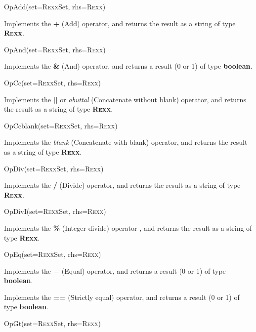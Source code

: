 \begin{description}
\item{OpAdd(set=R\textsc{exx}Set, rhs=R\textsc{exx})}

Implements the \nr{} \textbf{\textbf{+}} (Add) operator,
and returns the result as a string of type \textbf{R\textsc{exx}}.
\item{OpAnd(set=R\textsc{exx}Set, rhs=R\textsc{exx})}

Implements the \nr{} \textbf{\textbf{\&}} (And)
operator,
and returns a result (0 or 1) of type \textbf{boolean}.
\item{OpCc(set=R\textsc{exx}Set, rhs=R\textsc{exx})}

Implements the \nr{} \textbf{\textbf{||}} or
\emph{abuttal} (Concatenate without blank) operator, and
returns the result as a string of type \textbf{R\textsc{exx}}.
\item{OpCcblank(set=R\textsc{exx}Set, rhs=R\textsc{exx})}

Implements the \nr{} \emph{blank} (Concatenate with blank)
operator, and returns the result as a string of type \textbf{R\textsc{exx}}.
\item{OpDiv(set=R\textsc{exx}Set, rhs=R\textsc{exx})}

Implements the \nr{} \textbf{\textbf{/}} (Divide) operator,
and returns the result as a string of type \textbf{R\textsc{exx}}.
\item{OpDivI(set=R\textsc{exx}Set, rhs=R\textsc{exx})}

Implements the \nr{} \textbf{\textbf{\%}} (Integer divide) operator
, and returns the result as a string of type \textbf{R\textsc{exx}}.
\item{OpEq(set=R\textsc{exx}Set, rhs=R\textsc{exx})}

Implements the \nr{} \textbf{\textbf{=}} (Equal) operator,
and returns a result (0 or 1) of type \textbf{boolean}.

\item[OpEqS(set=R\textsc{exx}Set, rhs=R\textsc{exx})]\label{refopeqs}

Implements the \nr{} \textbf{\textbf{==}} (Strictly equal)
operator, and returns a result (0 or 1) of type \textbf{boolean}.
\item{OpGt(set=R\textsc{exx}Set, rhs=R\textsc{exx})}


\end{description}
